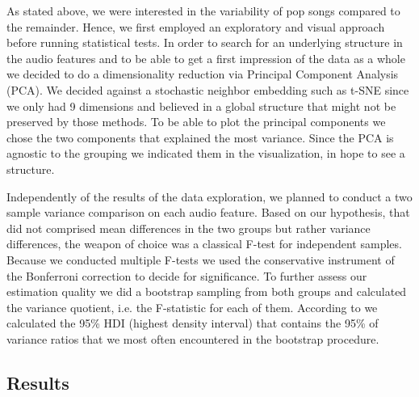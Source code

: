 \documentclass{article}
\begin{document}
As stated above, we were interested in the variability of pop songs compared to the remainder. Hence, we first employed an exploratory and visual approach before running statistical tests. In order to search for an underlying structure in the audio features and to be able to get a first impression of the data as a whole we decided to do a dimensionality reduction via Principal Component Analysis (PCA). We decided against a stochastic neighbor embedding such as t-SNE since we only had 9 dimensions and believed in a global structure that might not be preserved by those methods. To be able to plot the principal components we chose the two components that explained the most variance. Since the PCA is agnostic to the grouping we indicated them in the visualization, in hope to see a structure.

Independently of the results of the data exploration, we planned to conduct a two sample variance comparison on each audio feature. Based on our hypothesis, that did not comprised mean differences in the two groups but rather variance differences, the weapon of choice was a classical F-test for independent samples. Because we conducted multiple F-tests we used the conservative instrument of the Bonferroni correction to decide for significance. To further assess our estimation quality we did a bootstrap sampling from both groups and calculated the variance quotient, i.e. the F-statistic for each of them. According to %
we calculated the 95\% HDI (highest density interval) that contains the 95\% of variance ratios that we most often encountered in the bootstrap procedure.

\subsection{Results}
\end{document}
